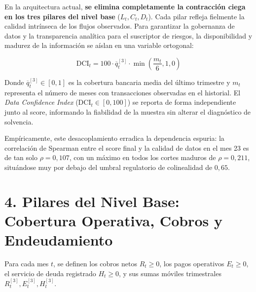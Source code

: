 \documentclass[10pt,a4paper]{article}
\begin{document}
En la arquitectura actual, \textbf{se elimina completamente la contracción ciega en los tres pilares del nivel base} ($L_t, C_t, D_t$). Cada pilar refleja fielmente la calidad intrínseca de los flujos observados. Para garantizar la gobernanza de datos y la transparencia analítica para el suscriptor de riesgos, la disponibilidad y madurez de la información se aíslan en una variable ortogonal:

\begin{tcolorbox}[formulabox]
\vspace{-0.2em}
\[
\boxed{\text{DCI}_t = 100 \cdot \overline{q}_t^{[3]} \cdot \min\left(\frac{m_t}{6}, 1{,}0\right)}
\]
\vspace{-0.4em}
\end{tcolorbox}

Donde $\overline{q}_t^{[3]} \in [0, 1]$ es la cobertura bancaria media del último trimestre y $m_t$ representa el número de meses con transacciones observadas en el historial. El \emph{Data Confidence Index} ($\text{DCI}_t \in [0, 100]$) se reporta de forma independiente junto al score, informando la fiabilidad de la muestra sin alterar el diagnóstico de solvencia. 

Empíricamente, este desacoplamiento erradica la dependencia espuria: la correlación de Spearman entre el score final y la calidad de datos en el mes 23 es de tan solo $\rho = 0{,}107$, con un máximo en todos los cortes maduros de $\rho = 0{,}211$, situándose muy por debajo del umbral regulatorio de colinealidad de $0{,}65$.

\section*{4. Pilares del Nivel Base: Cobertura Operativa, Cobros y Endeudamiento}

Para cada mes $t$, se definen los cobros netos $R_t \ge 0$, los pagos operativos $E_t \ge 0$, el servicio de deuda registrado $H_t \ge 0$, y sus sumas móviles trimestrales $R_t^{[3]}, E_t^{[3]}, H_t^{[3]}$.
\end{document}
